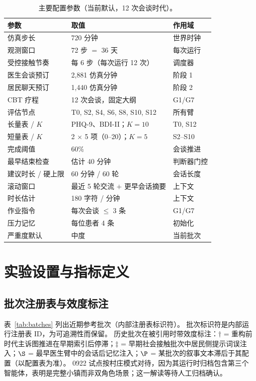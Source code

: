 \documentclass[11pt,a4paper]{article}
\begin{document}
\begin{table}[h]
\centering
\caption{主要配置参数（当前默认，12 次会谈时代）。}
\label{tab:config}
\small
\begin{tabular}{@{}lll@{}}
\toprule
参数 & 取值 & 作用域 \\
\midrule
仿真步长 & 720 分钟 & 世界时钟 \\
观测窗口 & 72 步 $=$ 36 天 & 每次运行 \\
受控接触节奏 & 每 6 步（每次运行 12 次） & 调度器 \\
医生会谈预订 & 2{,}881 仿真分钟 & 阶段 1 \\
居民聊天预订 & 1{,}440 仿真分钟 & 阶段 2 \\
CBT 疗程 & 12 次会谈，固定大纲 & G1/G7 \\
评估节点 & T0, S2, S4, S6, S8, S10, S12 & 所有臂 \\
长量表 / $K$ & PHQ-9、BDI-II；$K=10$ & T0, S12 \\
短量表 / $K$ & 2 $\times$ 5 项（0--20）；$K=5$ & S2--S10 \\
完成阈值 & 60\% & 会谈推进 \\
最早结束检查 & 估计 40 分钟 & 判断器门控 \\
建议时长 / 硬上限 & 60 分钟 / 60 轮 & 会话长度 \\
滚动窗口 & 最近 5 轮交流 $+$ 更早会话摘要 & 上下文 \\
时长估计 & 180 字符 / 分钟 & 上下文 \\
作业指令 & 每次会谈 $\le$ 3 条 & G1/G7 \\
压力记忆 & 每位患者 4 条 & 初始化 \\
严重度默认 & 中度 & 当前批次 \\
\bottomrule
\end{tabular}
\end{table}

\section{实验设置与指标定义}\label{app:settings}

\subsection{批次注册表与效度标注}

表~\ref{tab:batches} 列出近期参考批次（内部注册表标识符）。
批次标识符是内部运行注册表 ID，为可追溯性而保留。
历史批次在被引用时带效度标注：$\dagger$ = 重构前时代主诉图推进在早期索引后停滞；$\ddagger$ = 早期社会接触批次中居民侧提示词误注入；$\S$ = 最早医生臂中的会话后记忆注入；$\P$ = 某批次的叙事文本滞后于其配置（以配置表为准）。
0922 试点按村庄模式对待，因为其运行时归档包含第三个智能体，表明是完整小镇而非双角色场景；这一解读等待人工归档确认。
\end{document}
